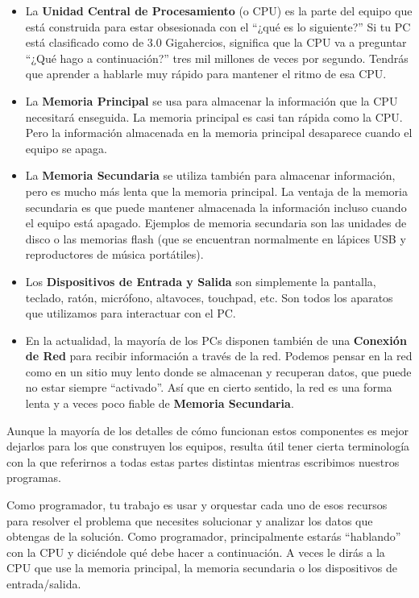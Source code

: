\begin{itemize}

\item La {\bf Unidad Central de Procesamiento} (o CPU) es
la parte del equipo que está construida para estar obsesionada
con el ``¿qué es lo siguiente?'' Si tu PC está clasificado
como de 3.0 Gigahercios, significa que la CPU va a preguntar ``¿Qué hago a continuación?''
tres mil millones de veces por segundo. Tendrás que aprender a hablarle muy
rápido para mantener el ritmo de esa CPU.

\item La {\bf Memoria Principal} se usa para almacenar la información
que la CPU necesitará enseguida. La memoria principal es casi
tan rápida como la CPU. Pero la información almacenada en la memoria
principal desaparece cuando el equipo se apaga.

\item La {\bf Memoria Secundaria} se utiliza también para almacenar
información, pero es mucho más lenta que la memoria principal.
La ventaja de la memoria secundaria es que puede mantener
almacenada la información incluso cuando el equipo está apagado.
Ejemplos de memoria secundaria son las unidades de disco o las
memorias flash (que se encuentran normalmente en lápices USB y
reproductores de música portátiles).

\item Los {\bf Dispositivos de Entrada y Salida} son simplemente
la pantalla, teclado, ratón, micrófono, altavoces, touchpad, etc.
Son todos los aparatos que utilizamos para interactuar con el PC.

\item En la actualidad, la mayoría de los PCs disponen también de una
{\bf Conexión de Red} para recibir información a través de la red.
Podemos pensar en la red como en un sitio muy lento donde se almacenan
y recuperan datos, que puede no estar siempre ``activado''. Así que en cierto sentido,
la red es una forma lenta y a veces poco fiable de
{\bf Memoria Secundaria}.

\end{itemize}

Aunque la mayoría de los detalles de cómo funcionan estos componentes es mejor
dejarlos para los que construyen los equipos, resulta útil tener cierta terminología
con la que referirnos a todas estas partes distintas mientras escribimos nuestros programas.

Como programador, tu trabajo es usar y orquestar cada uno de esos
recursos para resolver el problema que necesites solucionar
y analizar los datos que obtengas de la solución. Como programador, principalmente
estarás ``hablando'' con la CPU y diciéndole qué debe hacer a continuación.
A veces le dirás a la CPU que use la memoria principal,
la memoria secundaria o los dispositivos de entrada/salida.

